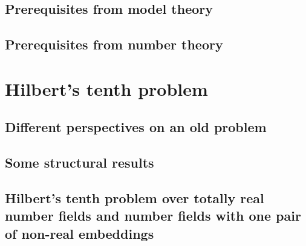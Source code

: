 \documentclass[12pt,
               a4paper,
               numbers=noenddot,
               final]{scrbook}
\numberwithin{equation}{section}
\begin{document}
\section{Prerequisites from model theory}\label{sec:model theory}


\section{Prerequisites from number theory}\label{sec:number theory}


\chapter{Hilbert's tenth problem}

\section{Different perspectives on an old problem}


\section{Some structural results}


\section[\textsc{H10} over totally real number fields and fields with one  pair
         of conjugate embeddings]
        {Hilbert's tenth problem over totally real number fields and number
         fields with one pair of non-real embeddings}


% 

% 
\end{document}
